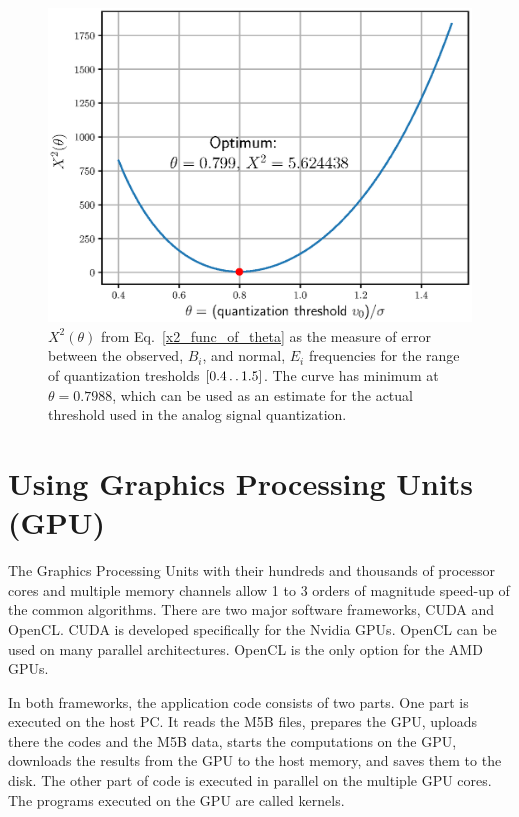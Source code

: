 \documentclass[letterpaper,twoside,12pt]{article}
\begin{document}
\begin{figure}[ht!]
  \begin{center}
  \includegraphics[width=30pc]{fig_optimal_quantization_threshold.eps}
  \caption{\small $X^2(\theta)$ from Eq.~\eqref{x2_func_of_theta} as the measure of error between the observed, $B_i$, and normal, $E_i$ frequencies for the range of quantization tresholds $[0.4 \mathinner{\ldotp\ldotp}1.5]$. The curve has minimum at $\theta = 0.7988$, which can be used as an estimate for the actual threshold used in the analog signal quantization.}
  \label{optimum_theta}
  \end{center}
\end{figure}


\section{Using Graphics Processing Units (GPU)}

The Graphics Processing Units with their hundreds and thousands of processor cores and multiple memory channels allow 1 to 3 orders of magnitude speed-up of the common algorithms. There are two major software frameworks, CUDA and OpenCL. CUDA is developed specifically for the Nvidia GPUs. OpenCL can be used on many parallel architectures. OpenCL is the only option for the AMD GPUs.

In both frameworks, the application code consists of two parts. One part is executed on the host PC. It reads the M5B files, prepares the GPU, uploads there the codes and the M5B data, starts the computations on the GPU, downloads the results from the GPU to the host memory, and saves them to the disk. The other part of code is executed in parallel on the multiple GPU cores. The programs executed on the GPU are called kernels. 
\end{document}
